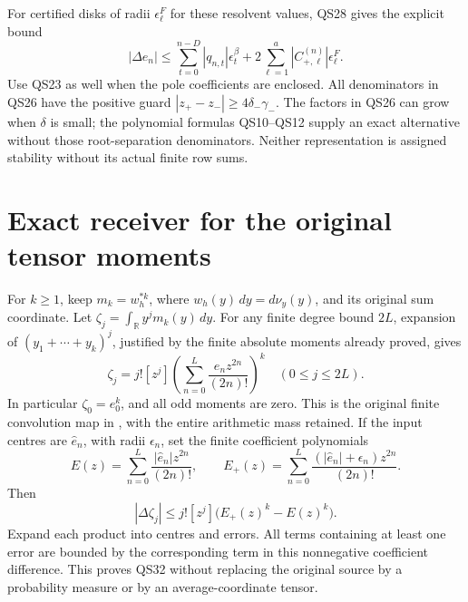 \documentclass[11pt]{article}
\newcommand{\R}{\mathbb R}
\begin{document}
For certified disks of radii \(\epsilon_\ell^F\) for these
resolvent values, QS28 gives the explicit bound
\begin{equation}\tag{QS30}
 |\Delta e_n|\le
 \sum_{t=0}^{n-D}|q_{n,t}|\epsilon_t^\beta+
                    2\sum_{\ell=1}^a
                            |C_{+,\ell}^{(n)}|\epsilon_\ell^F .
\end{equation}
Use QS23 as well when the pole coefficients are enclosed.
All denominators in QS26 have the positive guard
\(|z_+-z_-|\ge4\delta_-\gamma_-\).
The factors in QS26 can grow when \(\delta\) is small;
the polynomial formulas QS10--QS12 supply an exact alternative
without those root-separation denominators. Neither
representation is assigned stability without its actual
finite row sums.

\section{Exact receiver for the original tensor moments}

For \(k\ge1\), keep \(m_k=w_h^{*k}\), where
\(w_h(y)\,dy=d\nu_y(y)\), and its original sum coordinate.
Let \(\zeta_j=\int_{\R}y^jm_k(y)\,dy\).
For any finite degree bound \(2L\), expansion of
\((y_1+\cdots+y_k)^j\), justified by the finite absolute
moments already proved, gives
\begin{equation}\tag{QS31}
 \zeta_j=j![z^j]\left(\sum_{n=0}^L
                     \frac{e_nz^{2n}}{(2n)!}\right)^k
                 \quad(0\le j\le2L).
\end{equation}
In particular \(\zeta_0=e_0^k\), and all odd moments are
zero. This is the original finite convolution map in
\cite{MI}, with the entire arithmetic mass retained.
If the input centres are \(\widehat e_n\), with radii
\(\epsilon_n\), set the finite coefficient polynomials
\[
 E(z)=\sum_{n=0}^L\frac{|\widehat e_n|z^{2n}}{(2n)!},
 \qquad
 E_+(z)=\sum_{n=0}^L
             \frac{(|\widehat e_n|+\epsilon_n)z^{2n}}{(2n)!}.
\]
Then
\begin{equation}\tag{QS32}
 |\Delta\zeta_j|\le j![z^j]\bigl(E_+(z)^k-E(z)^k\bigr).
\end{equation}
Expand each product into centres and errors. All terms
containing at least one error are bounded by the corresponding
term in this nonnegative coefficient difference. This proves
QS32 without replacing the original source by a probability
measure or by an average-coordinate tensor.
\end{document}
